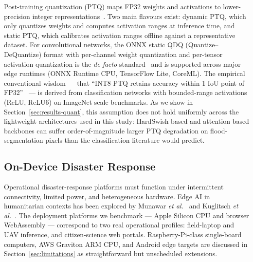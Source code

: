 Post-training quantization (PTQ) maps FP32 weights and activations to lower-precision integer representations~\cite{jacob2018quantization,krishnamoorthi2018quantizing}. Two main flavours exist: dynamic PTQ, which only quantizes weights and computes activation ranges at inference time, and static PTQ, which calibrates activation ranges offline against a representative dataset. For convolutional networks, the ONNX static QDQ (Quantize--DeQuantize) format with per-channel weight quantization and per-tensor activation quantization is the \emph{de facto} standard~\cite{ortQuant} and is supported across major edge runtimes (ONNX Runtime CPU, TensorFlow Lite, CoreML). The empirical conventional wisdom --- that ``INT8 PTQ retains accuracy within 1 IoU point of FP32''~\cite{krishnamoorthi2018quantizing} --- is derived from classification networks with bounded-range activations (ReLU, ReLU6) on ImageNet-scale benchmarks. As we show in Section~\ref{sec:results-quant}, this assumption does not hold uniformly across the lightweight architectures used in this study: HardSwish-based and attention-based backbones can suffer order-of-magnitude larger PTQ degradation on flood-segmentation pixels than the classification literature would predict.

\subsection{On-Device Disaster Response}
\label{sec:rw-ondevice}

Operational disaster-response platforms must function under intermittent connectivity, limited power, and heterogeneous hardware. Edge AI in humanitarian contexts has been explored by Munawar \emph{et al.}~\cite{munawar2021review} and Kuglitsch \emph{et al.}~\cite{kuglitsch2022facilitating}. The deployment platforms we benchmark --- Apple Silicon CPU and browser WebAssembly --- correspond to two real operational profiles: field-laptop and UAV inference, and citizen-science web portals. Raspberry-Pi-class single-board computers, AWS Graviton ARM CPU, and Android edge targets are discussed in Section~\ref{sec:limitations} as straightforward but unscheduled extensions.
